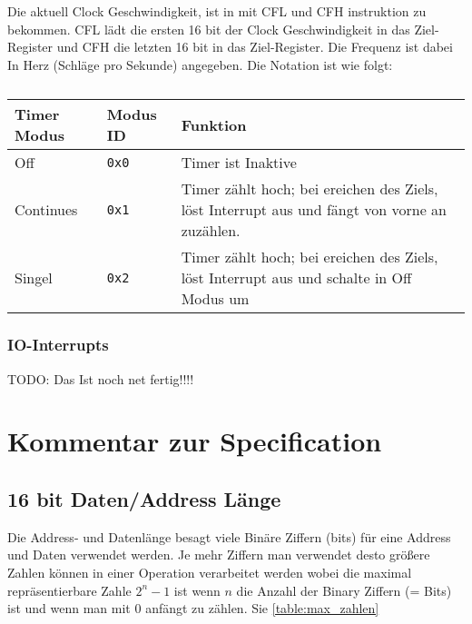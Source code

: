 \documentclass{scrartcl}
\begin{document}

Die aktuell Clock Geschwindigkeit, ist in mit CFL und CFH instruktion zu bekommen. CFL lädt die ersten 16 bit der Clock Geschwindigkeit in das Ziel-Register und CFH die letzten 16 bit in das Ziel-Register. Die Frequenz ist dabei In Herz (Schläge pro Sekunde) angegeben. Die Notation ist wie folgt:



\begin{center}
	\begin{table}
		\caption{\label{table:TimerModi}}
		\begin{tabular}{l  l | L{9cm}}
			Timer Modus & Modus ID & Funktion \\
			\hline
			Off & \texttt{0x0} & Timer ist Inaktive \\
			Continues & \texttt{0x1} & Timer zählt hoch; bei ereichen des Ziels, löst Interrupt aus und fängt von vorne an zuzählen. \\
			Singel & \texttt{0x2} & Timer zählt hoch; bei ereichen des Ziels, löst Interrupt aus und schalte in Off Modus um
		\end{tabular}
	\end{table}
\end{center}

\subsubsection{IO-Interrupts}

TODO: Das Ist noch net fertig!!!!



\section{Kommentar zur Specification}

\subsection{\label{section:comment:datalength}16 bit Daten/Address Länge}

Die Address- und Datenlänge besagt viele Binäre Ziffern (bits) für eine Address und Daten verwendet werden. Je mehr Ziffern man verwendet desto größere Zahlen können in einer Operation verarbeitet werden wobei die maximal repräsentierbare Zahle $2^n - 1$ ist wenn $n$ die Anzahl der Binary Ziffern (= Bits) ist und wenn man mit $0$ anfängt zu zählen. Sie \autoref{table:max_zahlen}
\end{document}
